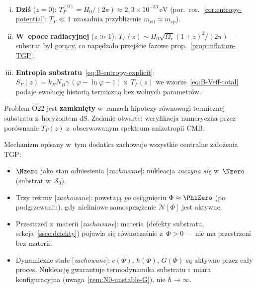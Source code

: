 \begin{corollary}%
\label{cor:O22-II-closed}
\begin{enumerate}[(i)]
  \item \textbf{Dzi\'s} ($z = 0$):
    $T_\Gamma^{(0)} = H_0/(2\pi)
    \approx 2{,}3 \times 10^{-33}\,\mathrm{eV}$
    (por.\ cor.~\ref{cor:entropy-potential}: $T_\Gamma \ll 1$
    uzasadnia przybli\.zenie $m_{\mathrm{eff}} \approx m_{\mathrm{sp}}$).
  \item \textbf{W~epoce radiacyjnej} ($z \gg 1$):
    $T_\Gamma(z) \sim H_0\sqrt{\Omega_r}(1+z)^2/(2\pi)$
    --- substrat by\l{} gor\k{a}cy, co nap\k{e}dza\l{}o przej\'scie fazowe
    prop.~\ref{prop:inflation-TGP}.
  \item \textbf{Entropia substratu}~\eqref{eq:B-entropy-explicit}:
    $S_\Gamma(z) = k_B N_B\gamma\,(\varphi - \ln\varphi - 1)$
    z~$T_\Gamma(z)$ we wzorze~\eqref{eq:B-Veff-total} podaje
    ewolucj\k{e} histori\k{a} termiczn\k{a} bez wolnych parametr\'ow.
\end{enumerate}
Problem O22 jest \textbf{zamkni\k{e}ty} w~ramach hipotezy
r\'ownowagi termicznej substratu z~horyzontem dS.
Zadanie otwarte: weryfikacja numeryczna przez por\'ownanie
$T_\Gamma(z)$ z~obserwowanym spektrum anizotropii CMB.
\end{corollary}

\begin{remark}
Mechanizm opisany w~tym dodatku zachowuje wszystkie
centralne za\l{}o\.zenia TGP:
\begin{itemize}[nosep]
  \item $\Nzero$ jako stan odniesienia [\emph{zachowane}]:
        nukleacja \emph{zaczyna si\k{e}} w~$\Nzero$ (substrat w~$\mathcal{S}_0$).
  \item Trzy re\.zimy [\emph{zachowane}]: powstaj\k{a}
        \emph{po} osi\k{a}gni\k{e}ciu $\Phi \approx \PhiZero$
        (po podgrzewaniu), gdy nieliniowe samosprz\k{e}\.zenie
        $\mathcal{N}[\Phi]$ jest aktywne.
  \item Przestrze\'n z~materii [\emph{zachowane}]: materia
        (defekty substratu, sekcja~\ref{ssec:defekty})
        pojawia si\k{e} r\'ownocze\'snie z~$\Phi > 0$ ---
        nie ma przestrzeni bez materii.
  \item Dynamiczne sta\l{}e [\emph{zachowane}]: $c(\Phi)$,
        $\hbar(\Phi)$, $G(\Phi)$ s\k{a} aktywne przez ca\l{}y
        proces. Nukleacj\k{e} gwarantuje termodynamika
        substratu i~miara konfiguracyjna
        (uwaga~\ref{rem:N0-unstable-G}), nie $\hbar\to\infty$.
\end{itemize}
\end{remark}
